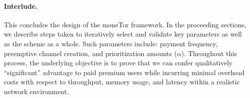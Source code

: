 
\paragraph*{Interlude.} This concludes the design of the moneTor framework. In
the proceeding sections, we describe steps taken to iteratively select and
validate key parameters as well as the scheme as a whole. Such parameters
include: payment frequency, preemptive channel creation, and prioritization
amounts ($\alpha$). Throughout this process, the underlying objective is to
prove that we can confer qualitatively ``significant'' advantage to paid premium
users while incurring minimal overhead costs with respect to throughput, memory
usage, and latency within a realistic network environment.


